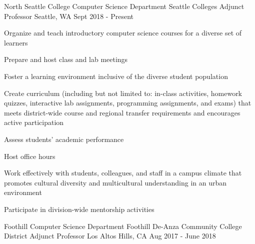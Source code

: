 \begin{cventries}
  \cventry
{North Seattle College Computer Science Department \newline Seattle Colleges}
    {Adjunct Professor}
    {Seattle, WA}
    {Sept 2018 - Present}
    {
      \begin{cvitems}
	\item {Organize and teach introductory computer science courses for a diverse set of learners}\\
	\begin{cvitems}
         \item Prepare and host class and lab meetings
                  \item Foster a learning environment inclusive of the diverse student population
                  \item Create curriculum (including but not limited to: in-class activities, homework quizzes, interactive lab assignments, programming assignments, and exams) that meets district-wide course and regional transfer requirements and encourages active participation
		\item Assess students' academic performance
		\item Host office hours
	\end{cvitems}
	\vspace{2mm}
	\item Work effectively with students, colleagues, and staff in a campus climate that promotes cultural diversity and multicultural understanding in an urban environment
	\item Participate in division-wide mentorship activities 
      \end{cvitems}
    }

  \cventry
{Foothill Computer Science Department \newline Foothill De-Anza Community College District}
    {Adjunct Professor}
    {Los Altos Hills, CA}
    {Aug 2017 - June 2018}
    {
      \begin{cvitems}
      \end{cvitems}
    }


\end{cventries}

